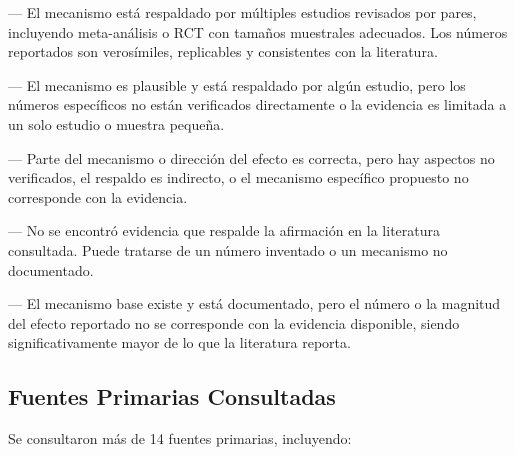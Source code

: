 \documentclass[12pt,a4paper]{article}
\newcommand{\veredicto}[1]{%
    \ifthenelse{\equal{#1}{fuerte}}{\textcolor{verde}{\textbf{✅ FUERTE}}}{%
    \ifthenelse{\equal{#1}{moderado}}{\textcolor{amarillo}{\textbf{⚠️ MODERADO}}}{%
    \ifthenelse{\equal{#1}{parcial}}{\textcolor{amarillo}{\textbf{⚠️ PARCIAL}}}{%
    \ifthenelse{\equal{#1}{sinrespaldo}}{\textcolor{rojo}{\textbf{❌ SIN RESPALDO}}}{%
    \ifthenelse{\equal{#1}{exagerado}}{\textcolor{rojo}{\textbf{❌ EXAGERADO}}}{#1}}}}}
}
\begin{document}
\begin{description}[itemsep=3pt]
    \item[\veredicto{fuerte}] — El mecanismo está respaldado por múltiples
        estudios revisados por pares, incluyendo meta-análisis o RCT con tamaños
        muestrales adecuados. Los números reportados son verosímiles, replicables
        y consistentes con la literatura.
    \item[\veredicto{moderado}] — El mecanismo es plausible y está respaldado
        por algún estudio, pero los números específicos no están verificados
        directamente o la evidencia es limitada a un solo estudio o muestra pequeña.
    \item[\veredicto{parcial}] — Parte del mecanismo o dirección del efecto es
        correcta, pero hay aspectos no verificados, el respaldo es indirecto, o
        el mecanismo específico propuesto no corresponde con la evidencia.
    \item[\veredicto{sinrespaldo}] — No se encontró evidencia que respalde la
        afirmación en la literatura consultada. Puede tratarse de un número
        inventado o un mecanismo no documentado.
    \item[\veredicto{exagerado}] — El mecanismo base existe y está documentado,
        pero el número o la magnitud del efecto reportado no se corresponde con
        la evidencia disponible, siendo significativamente mayor de lo que la
        literatura reporta.
\end{description}

\subsection{Fuentes Primarias Consultadas}

Se consultaron más de 14 fuentes primarias, incluyendo:
\end{document}
